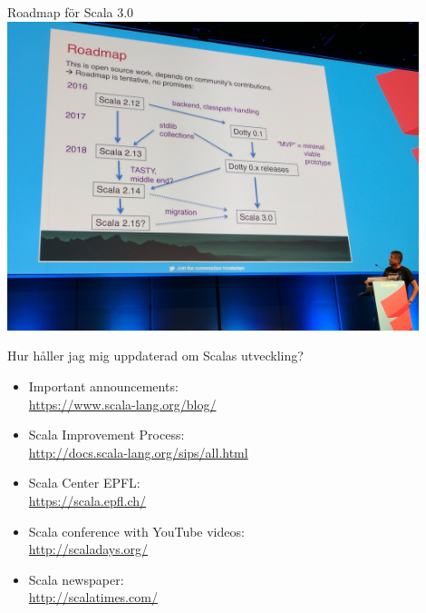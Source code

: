 \begin{Slide}{Roadmap för Scala 3.0}
  \includegraphics[width=0.9\textwidth]{../img/w14/scala-dotty-roadmap-odersky.jpeg}
\end{Slide}




\begin{Slide}{Hur håller jag mig uppdaterad om Scalas utveckling?}
\begin{itemize}
  \item Important announcements: \\\url{https://www.scala-lang.org/blog/}
  \item Scala Improvement Process: \\
  \url{http://docs.scala-lang.org/sips/all.html}
  \item  Scala Center \@ EPFL: \\ \url{https://scala.epfl.ch/}
  \item Scala conference with YouTube videos: \\ \url{http://scaladays.org/}
  \item Scala newspaper: \\\url{http://scalatimes.com/}
\end{itemize}
\end{Slide}




%
%


